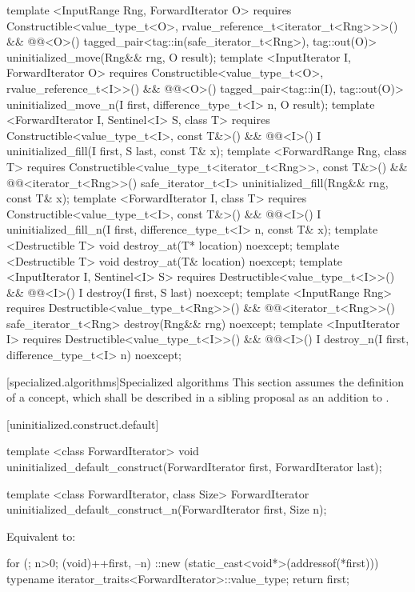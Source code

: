 {\begin{codeblock}
template <InputRange Rng, ForwardIterator O>
  requires Constructible<value_type_t<O>, rvalue_reference_t<iterator_t<Rng>>>() &&
           @@<O>()
    tagged_pair<tag::in(safe_iterator_t<Rng>), tag::out(O)>
    uninitialized_move(Rng&& rng, O result);
template <InputIterator I, ForwardIterator O>
  requires Constructible<value_type_t<O>, rvalue_reference_t<I>>() &&
           @@<O>()
    tagged_pair<tag::in(I), tag::out(O)>
    uninitialized_move_n(I first, difference_type_t<I> n, O result);
template <ForwardIterator I, Sentinel<I> S, class T>
  requires Constructible<value_type_t<I>, const T&>() &&
           @@<I>()
  I uninitialized_fill(I first, S last, const T& x);
template <ForwardRange Rng, class T>
  requires Constructible<value_type_t<iterator_t<Rng>>, const T&>() &&
            @@<iterator_t<Rng>>()
  safe_iterator_t<I>
  uninitialized_fill(Rng&& rng, const T& x);
template <ForwardIterator I, class T>
  requires Constructible<value_type_t<I>, const T&>() &&
           @@<I>()
  I uninitialized_fill_n(I first, difference_type_t<I> n, const T& x);
template <Destructible T>
  void destroy_at(T* location) noexcept;
template <Destructible T>
  void destroy_at(T& location) noexcept;
template <InputIterator I, Sentinel<I> S>
  requires Destructible<value_type_t<I>>() &&
           @@<I>()
    I destroy(I first, S last) noexcept;
template <InputRange Rng>
  requires Destructible<value_type_t<Rng>>() &&
           @@<iterator_t<Rng>>()
    safe_iterator_t<Rng> destroy(Rng&& rng) noexcept;
template <InputIterator I>
  requires Destructible<value_type_t<I>>() &&
           @@<I>()
    I destroy_n(I first, difference_type_t<I> n) noexcept;
\end{codeblock}
} %

\setcounter{subsection}{9}
[specialized.algorithms]{Specialized algorithms}
This section assumes the definition of a  concept, which shall be described in a sibling
proposal as an addition to .

[uninitialized.construct.default]{}
{\color{remclr}
\begin{codeblock}
template <class ForwardIterator>
  void uninitialized_default_construct(ForwardIterator first, ForwardIterator last);
\end{codeblock}

\begin{codeblock}
template <class ForwardIterator, class Size>
  ForwardIterator uninitialized_default_construct_n(ForwardIterator first, Size n);
\end{codeblock}

\setcounter{Paras}{1}
\pnum
\effects Equivalent to:
\begin{codeblock}
        for (; n>0; (void)++first, --n)
          ::new (static_cast<void*>(addressof(*first)))
            typename iterator_traits<ForwardIterator>::value_type;
        return first;
\end{codeblock}
} %

